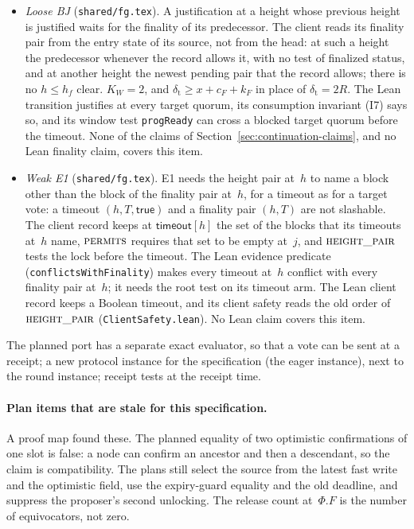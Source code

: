 \documentclass{article}
\newcommand{\Fr}{\Phi}
\begin{document}
\begin{itemize}
  record and the head.
\item[(P8)] \emph{Loose BJ} (\texttt{shared/fg.tex}).  A justification at
  a height whose previous height is justified waits for the finality of its predecessor.  The client
  reads its finality pair from the entry state of its source, not from the
  head: at such a height the predecessor whenever the record allows it,
  with no test of finalized status, and at another height the newest
  pending pair that the record allows; there is no $h\leq h_f$ clear.
  $K_W=2$, and $\delta_{\mathrm t}\geq x+c_F+k_F$ in place of
  $\delta_{\mathrm t}=2R$.  The Lean transition justifies at every target
  quorum, its consumption invariant (I7) says so, and its window test
  \texttt{progReady} can cross a blocked target quorum before the timeout.
  None of the claims of Section~\ref{sec:continuation-claims}, and no Lean
  finality claim, covers this item.
\item[(P9)] \emph{Weak E1} (\texttt{shared/fg.tex}).  E1 needs the height
  pair at~$h$ to name a block other than the block of the finality pair
  at~$h$, for a timeout as for a target vote: a timeout $(h,T,\mathsf{true})$
  and a finality pair $(h,T)$ are not slashable.  The client record keeps
  at $\mathsf{timeout}[h]$ the set of the blocks that its timeouts at~$h$
  name, $\Call{permits}{}$ requires that set to be empty at~$j$,
  and $\Call{height\_pair}{}$ tests the lock before the timeout.  The Lean
  evidence predicate (\texttt{conflictsWithFinality}) makes every timeout at~$h$ conflict
  with every finality pair at~$h$; it needs the root test on its timeout
  arm.  The Lean client record keeps a Boolean timeout, and its client
  safety reads the old order of $\Call{height\_pair}{}$
  (\texttt{ClientSafety.lean}).  No Lean claim covers this item.
\end{itemize}
The planned port has a separate exact evaluator, so that a vote can be sent at a
receipt; a new protocol instance for the specification (the eager
instance), next to the round instance; receipt tests at the receipt time.

\paragraph{Plan items that are stale for this specification.}
A proof map found these.  The planned equality of two optimistic confirmations of one slot
is false: a node can confirm an ancestor and then a descendant, so the
claim is compatibility.  The plans still select the source from the latest
fast write and the optimistic field, use the expiry-guard equality and the
old deadline, and suppress the proposer's second unlocking.  The release
count at~$\Fr.F$ is the number of equivocators, not zero.
\end{document}
